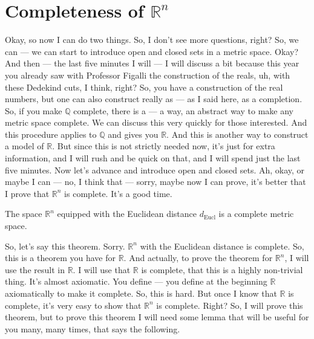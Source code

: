\section*{Completeness of \texorpdfstring{$\mathbb{R}^n$}{Rn}}

\begin{spoken-clean}[00:09:25 - 00:11:08]
Okay, so now I can do two things. So, I don't see more questions, right? So, we can --- we can start to introduce open and closed sets in a metric space. Okay? And then --- the last five minutes I will --- I will discuss a bit because this year you already saw with Professor Figalli the construction of the reals, uh, with these Dedekind cuts, I think, right? So, you have a construction of the real numbers, but one can also construct really as --- as I said here, as a completion. So, if you make $\mathbb{Q}$ complete, there is a --- a way, an abstract way to make any metric space complete. We can discuss this very quickly for those interested. And this procedure applies to $\mathbb{Q}$ and gives you $\mathbb{R}$. And this is another way to construct a model of $\mathbb{R}$. But since this is not strictly needed now, it's just for extra information, and I will rush and be quick on that, and I will spend just the last five minutes. Now let's advance and introduce open and closed sets. Ah, okay, or maybe I can --- no, I think that --- sorry, maybe now I can prove, it's better that I prove that $\mathbb{R}^n$ is complete. It's a good time.
\end{spoken-clean}

\begin{nice-box}
\setcounter{theorem}{32}
\begin{theorem}\label{thm:rn-complete}
The space $\mathbb{R}^n$ equipped with the Euclidean distance $d_{\text{Eucl}}$ is a complete metric space.
\end{theorem}
\end{nice-box}

\begin{spoken-clean}[00:11:08 - 00:12:38]
So, let's say this theorem.  Sorry. $\mathbb{R}^n$ with the Euclidean distance is complete. So, this is a theorem you have for $\mathbb{R}$. And actually, to prove the theorem for $\mathbb{R}^n$, I will use the result in $\mathbb{R}$. I will use that $\mathbb{R}$ is complete, that this is a highly non-trivial thing. It's almost axiomatic. You define --- you define at the beginning $\mathbb{R}$ axiomatically to make it complete. So, this is hard. But once I know that $\mathbb{R}$ is complete, it's very easy to show that $\mathbb{R}^n$ is complete. Right? So, I will prove this theorem, but to prove this theorem I will need some lemma that will be useful for you many, many times, that says the following.
\end{spoken-clean}

